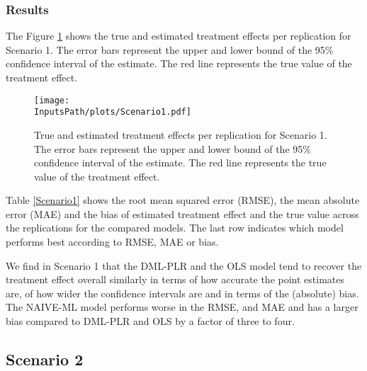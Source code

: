 \documentclass[10pt]{article}
\newcommand*{\InputsFolderPath}{C:/DEV/DML/src/data/}
\newcommand*{\InputsPath}{\InputsFolderPath/20221110/}
\begin{document}
\subsubsection{Results}
The Figure \ref{Scenario 1} shows the true and estimated treatment effects per replication for Scenario 1. 
The error bars represent the upper and lower bound of the 95\% confidence interval of the estimate. 
The red line represents the true value of the treatment effect.
\begin{figure}[H]
	\begin{center}
		\texttt{[image: \\InputsPath/plots/Scenario1.pdf]}
		\caption{True and estimated treatment effects per replication for Scenario 1. The error bars represent the upper and lower bound of the 95\% confidence interval of the estimate. The red line represents the true value of the treatment effect.}
		\label{Scenario 1}
	\end{center}
\end{figure}
Table \ref{Scenario1} shows the root mean squared error (RMSE), the mean absolute error (MAE) and the bias of estimated treatment effect and the true value across the replications for the compared models.
The last row indicates which model performs best according to RMSE, MAE or bias.

We find in Scenario 1 that the DML-PLR and the OLS model tend to recover the treatment effect overall similarly in terms of how accurate the point estimates are, of how wider the confidence intervals are and in terms of the (absolute) bias.
The NAIVE-ML model performs worse in the RMSE, and MAE and has a larger bias compared to DML-PLR and OLS by a factor of three to four.

\subsection{Scenario 2}
\end{document}
